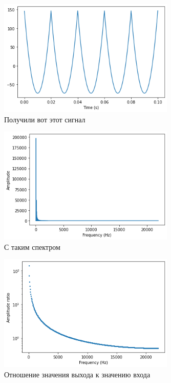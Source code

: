 \documentclass[a4paper, 12pt]{report}
\begin{document}
	\begin{figure}[H]
		\centering
		\includegraphics[width=0.75\textwidth]{sum3.png}
		\caption{Получили вот этот сигнал}
		\label{fig:sum3}
	\end{figure}
	\begin{figure}[H]
		\centering
		\includegraphics[width=0.75\textwidth]{sum4.png}
		\caption{С таким спектром}
		\label{fig:sum4}
	\end{figure}
	\begin{figure}[H]
		\centering
		\includegraphics[width=0.75\textwidth]{sum5.png}
		\caption{Отношение значения выхода к значению входа}
		\label{fig:sum5}
	\end{figure}
\end{document}
